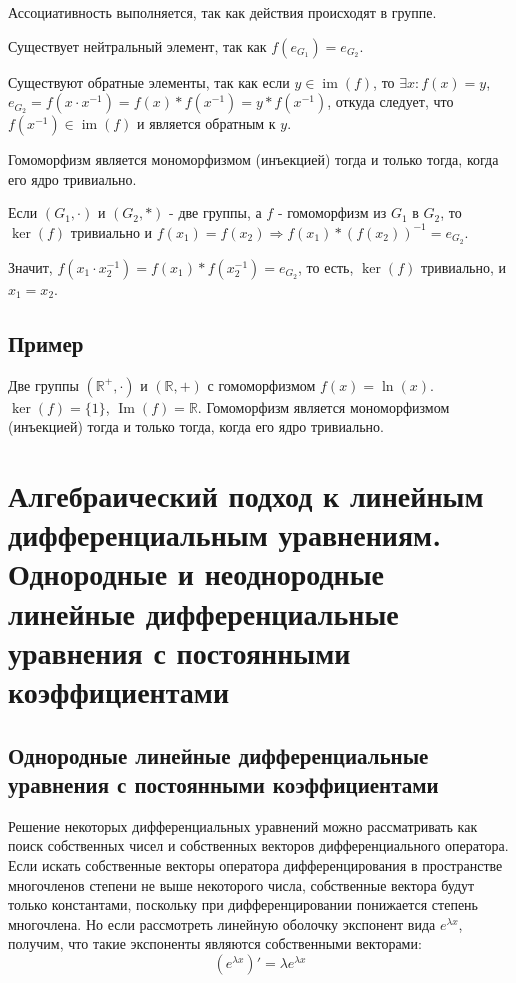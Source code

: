 \documentclass[12pt]{article}
\begin{document}
    Ассоциативность выполняется, так как действия происходят в группе.

    Существует нейтральный элемент, так как $f(e_{G_1})=e_{G_2}$.

    Существуют обратные элементы, так как если $y\in \operatorname{im}(f)$, то $\exists x:f(x)=y$, $e_{G_2}=f(x\cdot x^{-1})=f(x)*f(x^{-1})=y*f(x^{-1})$, откуда следует, что $f(x^{-1})\in \operatorname{im}(f)$ и является обратным к $y$.

    Гомоморфизм является мономорфизмом (инъекцией) тогда и только тогда, когда его ядро тривиально.

    Если $(G_1,\cdot)$ и $(G_2,*)$ - две группы, а $f$ - гомоморфизм из $G_1$ в $G_2$, то $\operatorname{ker}(f)$ тривиально и $f(x_1)=f(x_2)\Rightarrow f(x_1)*(f(x_2))^{-1}=e_{G_2}$.

    Значит, $f(x_1\cdot x_2^{-1})=f(x_1)*f(x_2^{-1})=e_{G_2}$, то есть, $\operatorname{ker}(f)$ тривиально, и $x_1=x_2$.

    \subsection{Пример}

    Две группы $(\mathbb{R}^{+},\cdot)$ и $(\mathbb{R},+)$ с гомоморфизмом $f(x) = \ln(x)$. $\ker(f) = \{1\}$, $\operatorname{Im}(f) = \mathbb{R}$. Гомоморфизм является мономорфизмом (инъекцией) тогда и только тогда, когда его ядро тривиально.

    \section{Алгебраический подход к линейным дифференциальным уравнениям. Однородные и неоднородные линейные дифференциальные уравнения с постоянными коэффициентами}

    \subsection{Однородные линейные дифференциальные уравнения с постоянными коэффициентами}
    Решение некоторых дифференциальных уравнений можно рассматривать как поиск
    собственных чисел и собственных векторов дифференциального оператора.  Если искать собственные векторы оператора дифференцирования в пространстве многочленов степени не выше некоторого числа, собственные вектора будут только константами, поскольку при дифференцировании понижается степень многочлена. Но если рассмотреть линейную оболочку экспонент вида $e^{\lambda x}$, получим, что такие экспоненты являются собственными векторами:
\[
    (e^{\lambda x})' = \lambda e^{\lambda x}
\]
\end{document}
